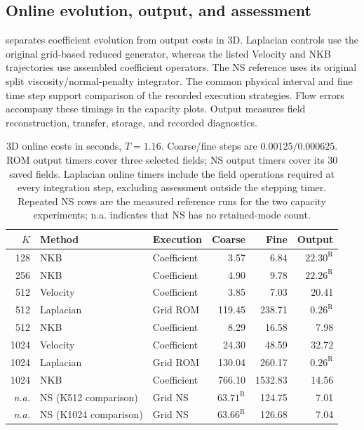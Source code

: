 \subsection{Online evolution, output, and assessment}
 separates coefficient evolution from output costs in 3D.
Laplacian controls use the original grid-based reduced generator, whereas the listed
Velocity and NKB trajectories use assembled coefficient operators. The NS reference
uses its original split viscosity/normal-penalty integrator. The common physical interval and fine time step support comparison of the recorded execution strategies.
Flow errors accompany these timings in the capacity plots. Output measures field
reconstruction, transfer, storage, and recorded diagnostics.

\begin{table}[!htb]\centering\footnotesize\setlength{\tabcolsep}{4pt}
\caption{3D online costs in seconds, $T=1.16$. Coarse/fine steps are $0.00125/0.000625$. ROM output timers cover three selected fields; NS output timers cover its 30 saved fields. Laplacian online timers include the field operations required at every integration step, excluding assessment outside the stepping timer. Repeated NS rows are the measured reference runs for the two capacity experiments; n.a. indicates that NS has no retained-mode count.}
\label{tab:nkb-runtime}

\begin{tabular}{rllrrr}\toprule
$K$&Method&Execution&Coarse&Fine&Output\\\midrule
128 & NKB & Coefficient & 3.57 & 6.84 & $22.30^{\mathrm R}$\\
256 & NKB & Coefficient & 4.90 & 9.78 & $22.26^{\mathrm R}$\\
512 & Velocity & Coefficient & 3.85 & 7.03 & 20.41\\
512 & Laplacian & Grid ROM & 119.45 & 238.71 & $0.26^{\mathrm R}$\\
512 & NKB & Coefficient & 8.29 & 16.58 & 7.98\\
1024 & Velocity & Coefficient & 24.30 & 48.59 & 32.72\\
1024 & Laplacian & Grid ROM & 130.04 & 260.17 & $0.26^{\mathrm R}$\\
1024 & NKB & Coefficient & 766.10 & 1532.83 & 14.56\\
\textit{n.a.} & NS (K512 comparison) & Grid NS & $63.71^{\mathrm R}$ & 124.75 & 7.01\\
\textit{n.a.} & NS (K1024 comparison) & Grid NS & $63.66^{\mathrm R}$ & 126.68 & 7.04\\
\bottomrule\end{tabular}\end{table}
